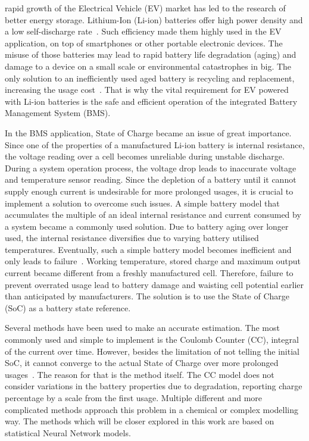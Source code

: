  rapid growth of the Electrical Vehicle (EV) market has led to the research of better energy storage.
Lithium-Ion (Li-ion) batteries offer high power density and a low self-discharge rate~\cite{han_review, en13082106}.
Such efficiency made them highly used in the EV application, on top of smartphones or other portable electronic devices.
The misuse of those batteries may lead to rapid battery life degradation (aging) and damage to a device on a small scale or environmental catastrophes in big.
The only solution to an inefficiently used aged battery is recycling and replacement, increasing the usage cost~\cite{skeete_beyond_2020}.
That is why the vital requirement for EV powered with Li-ion batteries is the safe and efficient operation of the integrated Battery Management System (BMS).

%
%
In the BMS application, State of Charge became an issue of great importance.
Since one of the properties of a manufactured Li-ion battery is internal resistance, the voltage reading over a cell becomes unreliable during unstable discharge.
During a system operation process, the voltage drop leads to inaccurate voltage and temperature sensor reading.
Since the depletion of a battery until it cannot supply enough current is undesirable for more prolonged usages, it is crucial to implement a solution to overcome such issues.
A simple battery model that accumulates the multiple of an ideal internal resistance and current consumed by a system became a commonly used solution.
Due to battery aging over longer used, the internal resistance diversifies due to varying battery utilised temperatures.
Eventually, such a simple battery model becomes inefficient and only leads to failure~\cite{fenrg.2019.00065}.
Working temperature, stored charge and maximum output current became different from a freshly manufactured cell.
Therefore, failure to prevent overrated usage lead to battery damage and waisting cell potential earlier than anticipated by manufacturers.
The solution is to use the State of Charge (SoC) as a battery state reference.

%
%
Several methods have been used to make an accurate estimation.
The most commonly used and simple to implement is the Coulomb Counter (CC), integral of the current over time.
However, besides the limitation of not telling the initial SoC, it cannot converge to the actual State of Charge over more prolonged usages~\cite{ng_enhanced_2009}.
The reason for that is the method itself.
The CC model does not consider variations in the battery properties due to degradation, reporting charge percentage by a scale from the first usage.
Multiple different and more complicated methods approach this problem in a chemical or complex modelling way.
The methods which will be closer explored in this work are based on statistical Neural Network models.

